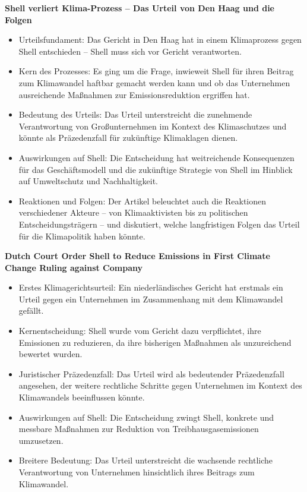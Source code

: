 \documentclass[a4paper, 12pt]{article} %
\begin{document}
 \textbf{\cite{deutschlandfunk.deShellVerliertKlimaProzess2021} Shell verliert Klima-Prozess – Das Urteil von Den Haag und die Folgen}

 \begin{itemize}
    \item Urteilsfundament: Das Gericht in Den Haag hat in einem Klimaprozess gegen Shell entschieden – Shell muss sich vor Gericht verantworten.
    \item Kern des Prozesses: Es ging um die Frage, inwieweit Shell für ihren Beitrag zum Klimawandel haftbar gemacht werden kann und ob das Unternehmen ausreichende Maßnahmen zur Emissionsreduktion ergriffen hat.
    \item Bedeutung des Urteils: Das Urteil unterstreicht die zunehmende Verantwortung von Großunternehmen im Kontext des Klimaschutzes und könnte als Präzedenzfall für zukünftige Klimaklagen dienen.
    \item Auswirkungen auf Shell: Die Entscheidung hat weitreichende Konsequenzen für das Geschäftsmodell und die zukünftige Strategie von Shell im Hinblick auf Umweltschutz und Nachhaltigkeit.
    \item Reaktionen und Folgen: Der Artikel beleuchtet auch die Reaktionen verschiedener Akteure – von Klimaaktivisten bis zu politischen Entscheidungsträgern – und diskutiert, welche langfristigen Folgen das Urteil für die Klimapolitik haben könnte.
 \end{itemize}

 \textbf{\cite{domans2021dutch} Dutch Court Order Shell to Reduce Emissions in First Climate Change Ruling against Company}
 
 \begin{itemize}
    \item Erstes Klimagerichtsurteil: Ein niederländisches Gericht hat erstmals ein Urteil gegen ein Unternehmen im Zusammenhang mit dem Klimawandel gefällt.
    \item Kernentscheidung: Shell wurde vom Gericht dazu verpflichtet, ihre Emissionen zu reduzieren, da ihre bisherigen Maßnahmen als unzureichend bewertet wurden.
    \item Juristischer Präzedenzfall: Das Urteil wird als bedeutender Präzedenzfall angesehen, der weitere rechtliche Schritte gegen Unternehmen im Kontext des Klimawandels beeinflussen könnte.
    \item Auswirkungen auf Shell: Die Entscheidung zwingt Shell, konkrete und messbare Maßnahmen zur Reduktion von Treibhausgasemissionen umzusetzen.
    \item Breitere Bedeutung: Das Urteil unterstreicht die wachsende rechtliche Verantwortung von Unternehmen hinsichtlich ihres Beitrags zum Klimawandel.
 \end{itemize}
\end{document}
